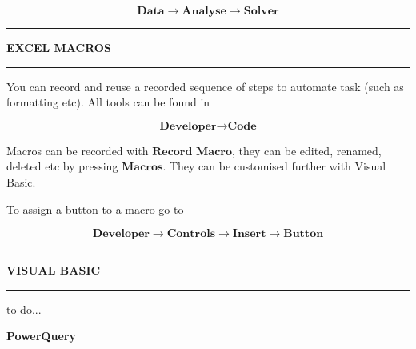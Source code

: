 \documentclass[8pt]{extarticle}
\newcommand{\heading}[1]{%
    \noindent
    \rule{\linewidth}{0.4pt}
    \begin{center}
        \vspace{-1ex}
        \textbf{#1}        
        \vspace{-2.5ex}
    \end{center}
    \rule{\linewidth}{0.4pt}
}
\begin{document}
\begin{multicols}{3}
\[ \textbf{Data} \rightarrow \textbf{Analyse} \rightarrow \textbf{Solver}\]

\heading{EXCEL MACROS}

You can record and reuse a recorded sequence of steps to automate task (such as formatting etc). All tools can be found in 

\[\textbf{Developer} \rightarrow \textbf{Code}\]

Macros can be recorded with $\textbf{Record Macro}$, they can be edited, renamed, deleted etc by pressing $\textbf{Macros}$. They can be customised further with Visual Basic.

To assign a button to a macro go to 

\[\textbf{Developer} \rightarrow \textbf{Controls} \rightarrow \textbf{Insert} \rightarrow \textbf{Button} \]

\heading{VISUAL BASIC}

to do...
\vspace*{\fill}
\end{multicols}


\newpage
\thispagestyle{empty} 
\begin{center}   
{\huge\textbf{PowerQuery}}\\
\vspace*{0.75cm}
\end{center}
\end{document}
